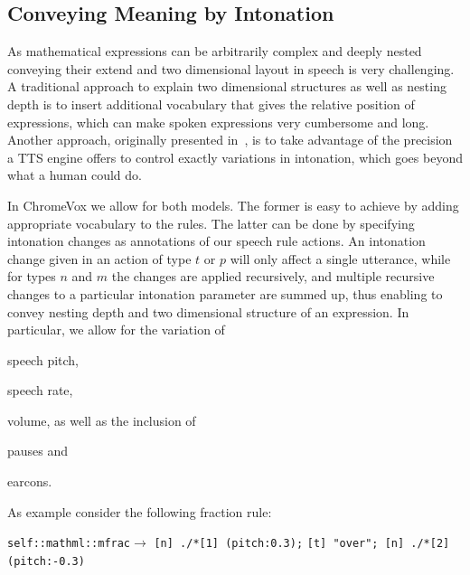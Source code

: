 \documentclass{sig-alternate}
\begin{document}




\subsection{Conveying Meaning by Intonation}

As mathematical expressions can be arbitrarily complex and deeply nested
conveying their extend and two dimensional layout in speech is very challenging.
A traditional approach to explain two dimensional structures as well as nesting
depth is to insert additional vocabulary that gives the relative position of
expressions, which can make spoken expressions very cumbersome and long.
Another approach, originally presented in~\cite{raman1994aster}, is to take
advantage of the precision a TTS engine offers to control exactly variations in
intonation, which goes beyond what a human could do.

In ChromeVox we allow for both models. The former is easy to achieve by adding
appropriate vocabulary to the rules. The latter can be done by specifying
intonation changes as annotations of our speech rule actions. An intonation
change given in an action of type $t$ or $p$ will only affect a single
utterance, while for types $n$ and $m$ the changes are applied recursively,
and multiple recursive changes to a particular intonation parameter are summed
up, thus enabling to convey nesting depth and two dimensional structure of an
expression.  In particular, we allow for the variation of
\begin{inparaenum}[(1)]
\item speech pitch,
\item speech rate,
\item volume, as well as the inclusion of
\item pauses and
\item earcons.
\end{inparaenum}

As example consider the following fraction rule:

\noindent\texttt{self::mathml::mfrac}$\longrightarrow$
\texttt{[n] ./*[1] (pitch:0.3);}\newline
\hspace*{\fill}\texttt{[t] "over"; [n] ./*[2] (pitch:-0.3)}
\end{document}

